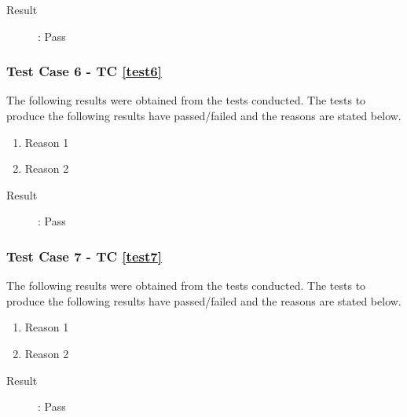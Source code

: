 \documentclass{article}
\begin{document}
\begin{description}
	\item [Result]: Pass 
\end{description}

\subsubsection{Test Case 6 - TC \ref{test6}}
The following results were obtained from the tests conducted. The tests to produce the
following results have passed/failed and the reasons are stated below.
\begin{enumerate}
	\item Reason 1
	\item Reason 2
\end{enumerate}

\begin{description}
	\item [Result]: Pass 
\end{description}

\subsubsection{Test Case 7 - TC \ref{test7}}
The following results were obtained from the tests conducted. The tests to produce the
following results have passed/failed and the reasons are stated below.
\begin{enumerate}
	\item Reason 1
	\item Reason 2
\end{enumerate}

\begin{description}
	\item [Result]: Pass 
\end{description}
\end{document}
